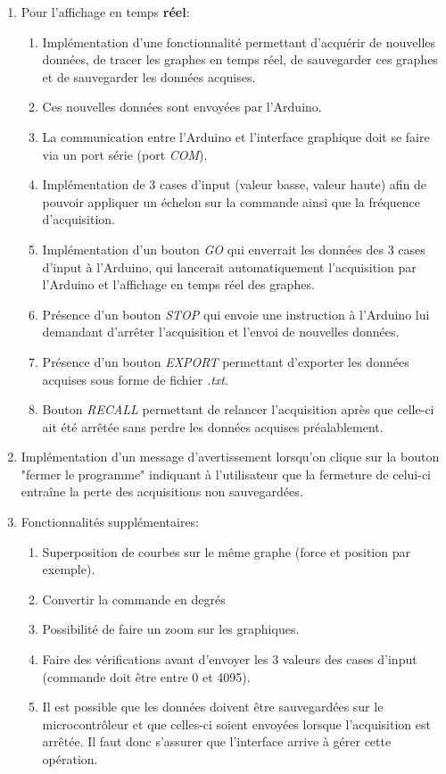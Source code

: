 \begin{enumerate}
    \item Pour l'affichage en temps \textbf{réel}:
    \begin{enumerate}
        \item Implémentation d'une fonctionnalité permettant d'acquérir de nouvelles données, de tracer les graphes en temps réel, de sauvegarder ces graphes et de sauvegarder les données acquises.
        \item Ces nouvelles données sont envoyées par l'Arduino.
        \item La communication entre l'Arduino et l'interface graphique doit se faire via un port série (port \textit{COM}).
        \item Implémentation de 3 cases d'input (valeur basse, valeur haute) afin de pouvoir appliquer un échelon sur la commande ainsi que la fréquence d'acquisition.
        \item Implémentation d'un bouton \textit{GO} qui enverrait les données des 3 cases d'input à l'Arduino, qui lancerait automatiquement l'acquisition par l'Arduino et l'affichage en temps réel des graphes.
        \item Présence d'un bouton \textit{STOP} qui envoie une instruction à l'Arduino lui demandant d'arrêter l'acquisition et l'envoi de nouvelles données.
        \item Présence d'un bouton \textit{EXPORT} permettant d'exporter les données acquises sous forme de fichier \textit{.txt}.
        \item Bouton \textit{RECALL} permettant de relancer l'acquisition après que celle-ci ait été arrêtée sans perdre les données acquises préalablement.
    \end{enumerate}
    
    \item Implémentation d'un message d'avertissement lorsqu'on clique sur la bouton "fermer le programme" indiquant à l'utilisateur que la fermeture de celui-ci entraîne la perte des acquisitions non sauvegardées.
    
    \item Fonctionnalités supplémentaires:
    \begin{enumerate}
        \item Superposition de courbes sur le même graphe (force et position par exemple).
        \item Convertir la commande en degrés
        \item Possibilité de faire un zoom sur les graphiques.
        \item Faire des vérifications avant d'envoyer les 3 valeurs des cases d'input (commande doit être entre 0 et 4095).
        \item Il est possible que les données doivent être sauvegardées sur le microcontrôleur et que celles-ci soient envoyées lorsque l'acquisition est arrêtée. Il faut donc s'assurer que l'interface arrive à gérer cette opération.
    \end{enumerate}
\end{enumerate}

